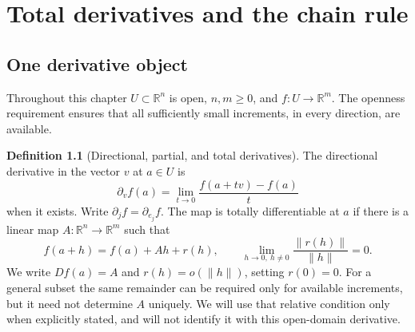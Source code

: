 \documentclass[11pt,oneside,openany]{book}
\theoremstyle{definition}
\newtheorem{definition}[theorem]{Definition}
\theoremstyle{remark}
\newcommand{\R}{\mathbb R}
\newcommand{\norm}[1]{\lVert#1\rVert}
\newcommand{\family}[1]{}
\begin{document}


\chapter{Total derivatives and the chain rule}
\label{ch:d04-02}

\section{One derivative object}
\family{K04.02.01}\family{K04.02.02}\family{K04.02.03}\family{K04.02.04}

Throughout this chapter $U\subset\R^n$ is open, $n,m\geq0$, and
$f:U\to\R^m$. The openness requirement ensures that all sufficiently small
increments, in every direction, are available.

\begin{definition}[Directional, partial, and total derivatives]\label{d04:02:derivative}
The directional derivative in the vector $v$ at $a\in U$ is
\[
 \partial_vf(a)=\lim_{t\to0}\frac{f(a+tv)-f(a)}t
\]
when it exists. Write $\partial_jf=\partial_{e_j}f$. The map is totally
differentiable at $a$ if there is a linear map $A:\R^n\to\R^m$ such that
\[
 f(a+h)=f(a)+Ah+r(h),\qquad
 \lim_{h\to0,\ h\ne0}\frac{\norm{r(h)}}{\norm{h}}=0.
\]
We write $Df(a)=A$ and $r(h)=o(\norm{h})$, setting $r(0)=0$.
For a general subset the same remainder can be required only for available
increments, but it need not determine $A$ uniquely. We will use that relative
condition only when explicitly stated, and will not identify it with this
open-domain derivative.
\end{definition}
\end{document}
